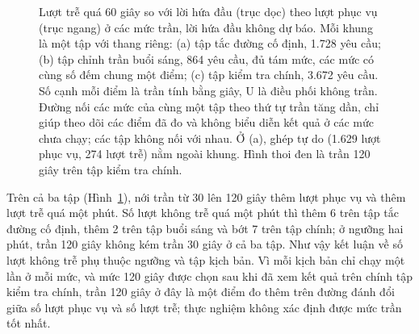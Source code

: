 \begin{figure}[htbp]
\caption{Lượt trễ quá 60 giây so với lời hứa đầu (trục dọc) theo lượt phục vụ (trục ngang) ở các mức
trần, lời hứa đầu không dự báo. Mỗi khung là một tập với thang riêng: (a) tập tắc đường cố định, 1.728
yêu cầu; (b) tập chỉnh trần buổi sáng, 864 yêu cầu, đủ tám mức, các mức có cùng số đếm chung một điểm; (c) tập
kiểm tra chính, 3.672 yêu cầu. Số cạnh mỗi điểm là trần tính bằng giây, U là điều phối không trần. Đường nối các mức
của cùng một tập theo thứ tự trần tăng dần, chỉ giúp theo dõi các điểm đã đo và không biểu diễn kết quả ở các mức
chưa chạy; các tập không nối với nhau. Ở (a), ghép tự do (1.629 lượt phục vụ, 274 lượt trễ) nằm ngoài khung. Hình
thoi đen là trần 120 giây trên tập kiểm tra chính.}
\label{hinh:c4-tran}
\end{figure}

Trên cả ba tập (Hình~\ref{hinh:c4-tran}), nới trần từ 30 lên 120 giây thêm lượt phục vụ và thêm lượt trễ quá một
phút. Số lượt không trễ quá một phút thì thêm 6 trên tập tắc đường cố định, thêm 2 trên tập buổi sáng và bớt 7 trên
tập chính; ở ngưỡng hai phút, trần 120 giây không kém trần 30 giây ở cả ba tập. Như vậy kết luận về số lượt không trễ
phụ thuộc ngưỡng và tập kịch bản. Vì mỗi kịch bản chỉ chạy một lần ở mỗi mức, và mức 120 giây được chọn sau khi đã
xem kết quả trên chính tập kiểm tra chính, trần 120 giây ở đây là một điểm đo thêm trên đường đánh đổi giữa số lượt
phục vụ và số lượt trễ; thực nghiệm không xác định được mức trần tốt nhất.

